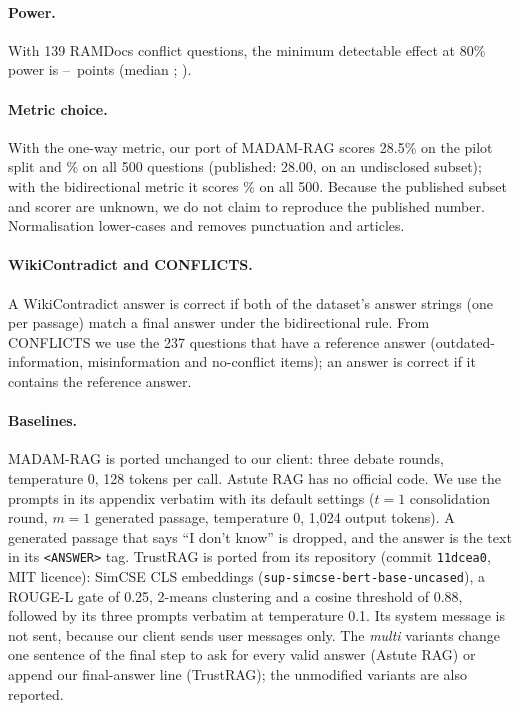\paragraph{Power.} With 139 RAMDocs conflict questions, the minimum detectable effect at 80\% power is
\mdeLo--\mdeHi\ points (median \mdeMed; \citealp{card2020power}).

\paragraph{Metric choice.} With the one-way metric, our port of MADAM-RAG scores 28.5\% on the pilot split and
\madamOneWay\% on all 500 questions (published: 28.00, on an undisclosed subset); with the bidirectional metric it
scores \madamBidir\% on all 500. Because the published subset and scorer are unknown, we do not claim to reproduce the
published number. Normalisation lower-cases and removes punctuation and articles.

\paragraph{WikiContradict and CONFLICTS.} A WikiContradict answer is correct if both of the dataset's answer strings
(one per passage) match a final answer under the bidirectional rule. From CONFLICTS we use the 237 questions that
have a reference answer (outdated-information, misinformation and no-conflict items); an answer is correct if it
contains the reference answer.

\paragraph{Baselines.} MADAM-RAG is ported unchanged to our client: three debate rounds, temperature 0, 128 tokens
per call. Astute RAG has no official code. We use the prompts in its appendix verbatim with its default
settings ($t{=}1$ consolidation round, $m{=}1$ generated passage, temperature 0, 1,024 output tokens). A generated
passage that says ``I don't know'' is dropped, and the answer is the text in its \texttt{<ANSWER>} tag. TrustRAG is
ported from its repository (commit \texttt{11dcea0}, MIT licence): SimCSE CLS embeddings
(\texttt{sup-simcse-bert-base-uncased}), a ROUGE-L gate of 0.25, 2-means clustering and a cosine threshold of 0.88,
followed by its three prompts verbatim at temperature 0.1. Its system message is not sent, because our client sends
user messages only. The \emph{multi} variants change one sentence of the final step to ask for every valid answer
(Astute RAG) or append our final-answer line (TrustRAG); the unmodified variants are also reported.

